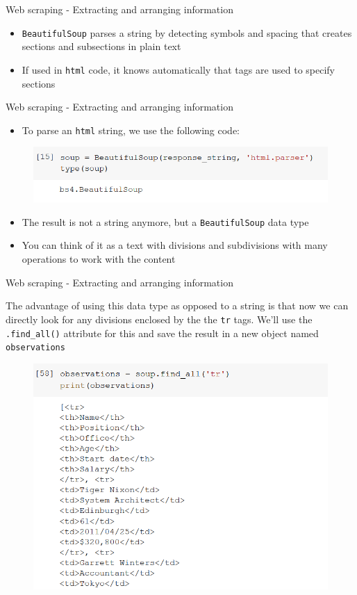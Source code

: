 \documentclass[aspectratio=169]{beamer}
\begin{document}
\begin{frame}{Web scraping - Extracting and arranging information}

	\begin{itemize}	
		\item \texttt{BeautifulSoup} parses a string by detecting symbols and spacing that creates sections and subsections in plain text
		\item If used in \texttt{html} code, it knows automatically that tags are used to specify sections
	\end{itemize}

\end{frame}

\begin{frame}{Web scraping - Extracting and arranging information}

	\begin{itemize}
		\item To parse an \texttt{html} string, we use the following code:
	\end{itemize}

	\begin{figure}
		\centering
		\includegraphics[width=0.7\linewidth]{img/bs4_type.png}
	\end{figure}

	\begin{itemize}	
		\item The result is not a string anymore, but a \texttt{BeautifulSoup} data type
		\item You can think of it as a text with divisions and subdivisions with many operations to work with the content
	\end{itemize}

\end{frame}

\begin{frame}{Web scraping - Extracting and arranging information}

	The advantage of using this data type as opposed to a string is that now we can directly look for any divisions enclosed by the the \texttt{tr} tags. We'll use the \texttt{.find\_all()} attribute for this and save the result in a new object named \texttt{observations}

	\begin{figure}
		\centering
		\includegraphics[width=0.45\linewidth]{img/tr_list.png}
	\end{figure}

\end{frame}
\end{document}
